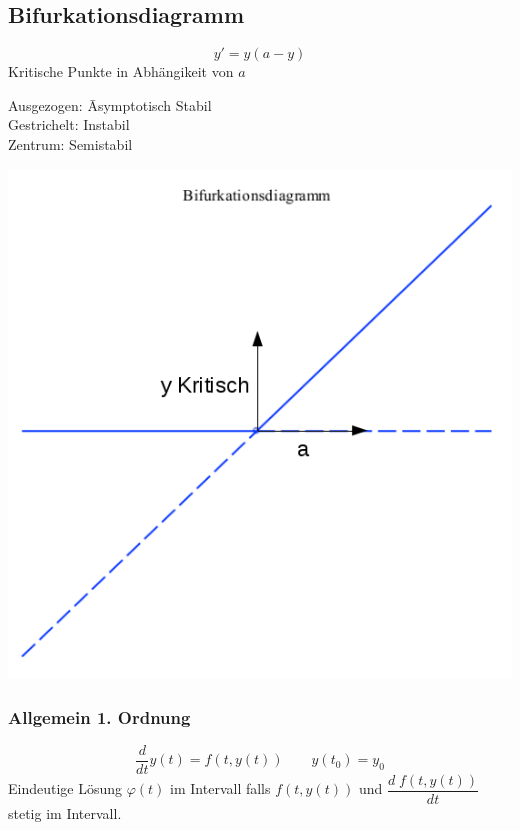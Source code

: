 \subsection{Bifurkationsdiagramm}
\begin{minipage}[h]{0.35\textwidth}
\[y'=y(a-y)\]
Kritische Punkte in Abhängikeit von $a$\\
\begin{tabbing}
Ausgezogen: \= Asymptotisch Stabil\\
Gestrichelt: \> Instabil\\
Zentrum: \> Semistabil\\
\end{tabbing}
\end{minipage}
\begin{minipage}[h]{0.35\textwidth}
	\includegraphics[width=1.0\textwidth]{images/Bifurkationsdiagramm.png}
\end{minipage}

\subsubsection{Allgemein 1. Ordnung}
\[ \dfrac{d}{dt}y(t)=f(t,y(t)) \qquad y(t_0)=y_0 \]
Eindeutige Lösung $\varphi(t)$ im Intervall falls $f(t,y(t))$ und $\dfrac{d \; f(t,y(t))}{dt}$ stetig im Intervall.


